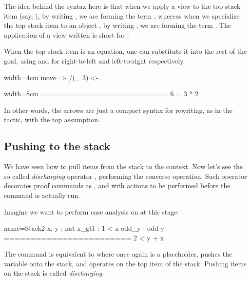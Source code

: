 The idea behind the syntax here is that when we apply a view  to
the top stack item (say, ), by writing , we are
forming the term , whereas
when we specialize the top stack item  to an object ,
by writing , we are forming the term .
The application of a view written  is short for .

When the top stack item is an equation, one can substitute it into
the rest of the goal, using \C{<-} and \C{->} for
right-to-left and left-to-right respectively.

\begin{coq-left}{}{width=4cm}
move=> /(_ 3) <-.
$~$
\end{coq-left}
\begin{coqout-right}{}{width=8cm}
========================
6 = 3 * 2
\end{coqout-right}

In other words, the arrows are just a compact syntax for rewriting,
as in the  tactic, with the top assumption.

\subsection{Pushing to the stack}

We have seen how to pull items from the stack to the context.
Now let's see the so called \emph{discharging} operator \C{:}, performing
the converse operation.
Such operator decorates
proof commands as ,  and 
 with actions to be performed before the command is actually run.


Imagine we want to perform case analysis on  at this stage:

\begin{coqout}{name=Stack2}{}
 x, y : nat
 x_gt1 : 1 < x
 odd_y : odd y
 ========================
 2 < y + x
\end{coqout}

The command  is equivalent to
 where  once again is a placeholder,
 pushes the  variable onto the stack, and 
operates on the top item of the stack.
Pushing items on the stack is called \emph{discharging}.

